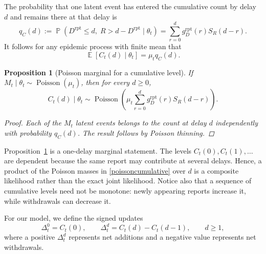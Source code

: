 \documentclass{article}
\newtheorem{proposition}{Proposition}
\theoremstyle{definition}
\theoremstyle{remark}
\newcommand{\Pois}{\operatorname{Poisson}}
\newcommand{\E}{\operatorname{\mathbb{E}}}
\newcommand{\Prb}{\operatorname{\mathbb{P}}}
\begin{document}
The probability that one latent event has entered the cumulative count by
delay $d$ and remains there at that delay is
\begin{equation}\label{qCdef}
    q_C(d)
    :=
    \Prb\left(
    D^{\mathrm{rpt}}\leq d,\;
    R>d-D^{\mathrm{rpt}}
    \mid\theta_t
    \right)
    =
    \sum_{r=0}^{d}
    g_D^{\mathrm{rpt}}(r)S_R(d-r).
\end{equation}
It follows for any epidemic process with finite mean that
\begin{equation}\label{cummean}
    \E[C_t(d)\mid\theta_t]
    =
    \mu_t q_C(d).
\end{equation}

\begin{proposition}[Poisson marginal for a cumulative level]
\label{prop:poissoncumulative}
If $M_t\mid\theta_t\sim\Pois(\mu_t)$, then for every $d\geq0$,
\begin{equation}\label{poissoncumulative}
    C_t(d)\mid\theta_t
    \sim
    \Pois\left(
    \mu_t
    \sum_{r=0}^{d}
    g_D^{\mathrm{rpt}}(r)S_R(d-r)
    \right).
\end{equation}
\begin{proof}
Each of the $M_t$ latent events belongs to the count at delay $d$ independently
with probability $q_C(d)$. The result follows by Poisson thinning.
\end{proof}
\end{proposition}

Proposition~\ref{prop:poissoncumulative} is a one-delay marginal statement.
The levels $C_t(0),C_t(1),\dots$ are dependent because the same report may
contribute at several delays. Hence, a product of the Poisson masses in
\eqref{poissoncumulative} over $d$ is a composite likelihood rather than the
exact joint likelihood. Notice also that a sequence of cumulative levels need
not be monotone: newly appearing reports increase it, while withdrawals can
decrease it.

For our model, we define the signed updates
\begin{equation}\label{signedupdates}
    \Delta^0_t = C_t(0),
    \qquad
    \Delta^d_t = C_t(d) - C_t(d-1), \qquad d\geq 1,
\end{equation}
where a positive $\Delta^d_t$ represents net additions and a negative value represents net withdrawals.
\end{document}
